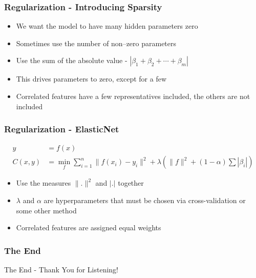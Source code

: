 \documentclass{beamer}
\begin{document}
\begin{frame}
\frametitle{Regularization - Introducing Sparsity}
\begin{itemize}
\item We want the model to have many hidden parameters zero
\item Sometimes use the number of non--zero parameters
\item Use the sum of the absolute value - $| \beta_1 + \beta_2 + \cdots + \beta_m |$
\item This drives parameters to zero, except for a few
\item Correlated features have a few representatives included, the others are not included
\end{itemize}
\end{frame}

\begin{frame}
\frametitle{Regularization - ElasticNet}
\begin{align}
y &= f(x) \\
C(x, y) &= \min_f \sum_{i=1}^{n} \| f(x_i) - y_i \|^2 + \lambda \left( \| f \|^2 + (1 - \alpha) \sum \left| \beta_i \right| \right)
\end{align}
\begin{itemize}
\item Use the measures $\|. \|^2$ and $|.|$ together
\item $\lambda$ and $\alpha$ are hyperparameters that must be chosen via cross-validation or some other method
\item Correlated features are assigned equal weights
\end{itemize}
\end{frame}


\begin{frame}
\frametitle{The End}
\Huge{\centerline{The End - Thank You for Listening!}}
\end{frame}

\end{document}
